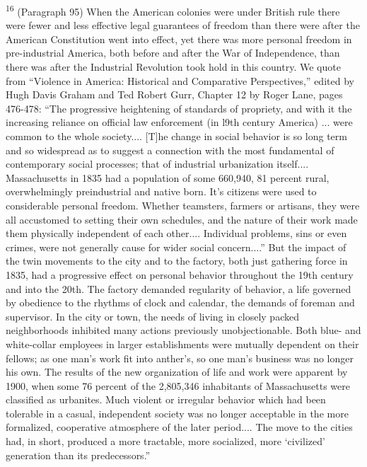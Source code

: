 \documentclass{article}
\begin{document}
\textsuperscript{16} (Paragraph 95) When the American colonies were under British rule there were fewer and less 
effective legal guarantees of freedom than there were after the American Constitution went into 
effect, yet there was more personal freedom in pre-industrial America, both before and after the 
War of Independence, than there was after the Industrial Revolution took hold in this 
country. We quote from “Violence in America: Historical and Comparative Perspectives,” 
edited by Hugh Davis Graham and Ted Robert Gurr, Chapter 12 by Roger Lane, pages 476-478: 
“The progressive heightening of standards of propriety, and with it the increasing reliance on 
official law enforcement (in l9th century America) ... were common to the whole 
society.... [T]he change in social behavior is so long term and so widespread as to suggest a 
connection with the most fundamental of contemporary social processes; that of industrial 
urbanization itself.... Massachusetts in 1835 had a population of some 660,940, 81 percent rural, 
overwhelmingly preindustrial and native born. It’s citizens were used to considerable personal 
freedom. Whether teamsters, farmers or artisans, they were all accustomed to setting their own 
schedules, and the nature of their work made them physically independent of each 
other.... Individual problems, sins or even crimes, were not generally cause for wider social 
concern....” But the impact of the twin movements to the city and to the factory, both just 
gathering force in 1835, had a progressive effect on personal behavior throughout the 19th 
century and into the 20th. The factory demanded regularity of behavior, a life governed by 
obedience to the rhythms of clock and calendar, the demands of foreman and supervisor. In the 
city or town, the needs of living in closely packed neighborhoods inhibited many actions 
previously unobjectionable. Both blue- and white-collar employees in larger establishments 
were mutually dependent on their fellows; as one man’s work fit into anther’s, so one man’s 
business was no longer his own. The results of the new organization of life and work were 
apparent by 1900, when some 76 percent of the 2,805,346 inhabitants of Massachusetts were 
classified as urbanites. Much violent or irregular behavior which had been tolerable in a casual, 
independent society was no longer acceptable in the more formalized, cooperative atmosphere of 
the later period.... The move to the cities had, in short, produced a more tractable, more 
socialized, more ‘civilized’ generation than its predecessors.” \vspace{\baselineskip}
\end{document}
